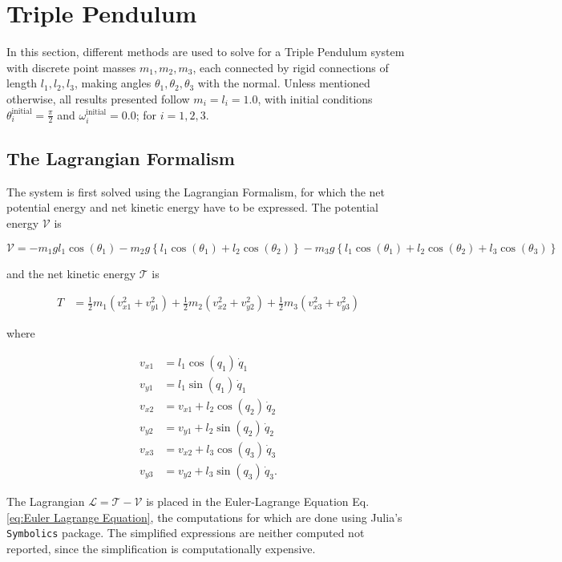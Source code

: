 \section{Triple Pendulum}
In this section, different methods are used to solve for a Triple Pendulum system with discrete point masses $m_1, m_2, m_3$, each connected by rigid connections of length $l_1, l_2, l_3$, making angles $\theta_1, \theta_2, \theta_3$ with the normal. Unless mentioned otherwise, all results presented follow $m_i = l_i = 1.0$, with initial conditions $\theta_i^\text{initial} = \frac{\pi}{2}$ and $\omega_i^\text{initial} = 0.0$; for $i = 1,2,3$.

\subsection{The Lagrangian Formalism}
The system is first solved using the Lagrangian Formalism, for which the net potential energy and net kinetic energy have to be expressed. The potential energy $\mathcal{V}$ is

\begin{equation}
    \mathcal{V} = -m_1gl_1\cos(\theta_1) - m_2g \left\{ l_1\cos(\theta_1) + l_2\cos(\theta_2) \right\} -
    m_3g \left\{l_1\cos(\theta_1) + l_2\cos(\theta_2) + l_3\cos(\theta_3) \right\}
\end{equation}

and the net kinetic energy $\mathcal{T}$ is

\begin{align}
    T &= \frac{1}{2} m_1 \left( v_{x1}^2 + v_{y1}^2 \right) + \frac{1}{2} m_2 \left( v_{x2}^2 + v_{y2}^2 \right) + \frac{1}{2} m_3 \left( v_{x3}^2 + v_{y3}^2 \right)
\end{align}

where

\begin{align}
    v_{x1} &= l_1 \cos(q_1) \, \dot{q}_1 \\
    v_{y1} &= l_1 \sin(q_1) \, \dot{q}_1 \\[0.5em]
    v_{x2} &= v_{x1} + l_2 \cos(q_2) \, \dot{q}_2 \\
    v_{y2} &= v_{y1} + l_2 \sin(q_2) \, \dot{q}_2 \\[0.5em]
    v_{x3} &= v_{x2} + l_3 \cos(q_3) \, \dot{q}_3 \\
    v_{y3} &= v_{y2} + l_3 \sin(q_3) \, \dot{q}_3.
\end{align}

The Lagrangian $\mathcal{L} = \mathcal{T} - \mathcal{V}$ is placed in the Euler-Lagrange Equation Eq. \ref{eq:Euler Lagrange Equation}, the computations for which are done using Julia's \texttt{Symbolics} package. The simplified expressions are neither computed not reported, since the simplification is computationally expensive.

